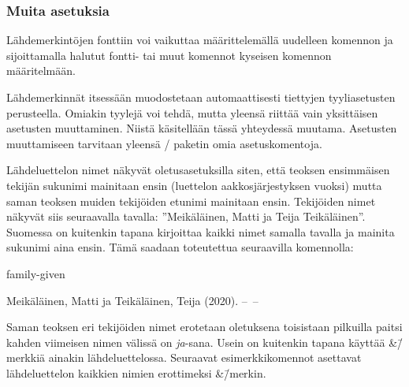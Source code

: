 \begin{koodilohkosis}
  \setlength{\bibitemsep}{.5ex plus .1ex minus .1ex}
  \setlength{\bibnamesep}{1em  plus .2ex minus .1ex}
  \setlength{\bibinitsep}{2em  plus .2ex minus .1ex}
\end{koodilohkosis}

\subsubsection{Muita asetuksia}

Lähdemerkintöjen fonttiin voi vaikuttaa määrittelemällä uudelleen
komennon  ja sijoittamalla halutut fontti- tai muut
komennot kyseisen komennon määritelmään.

\begin{koodilohkosis}
  \renewcommand{\bibfont}{\sffamily\small}
\end{koodilohkosis}

Lähdemerkinnät itsessään muodostetaan automaattisesti tiettyjen
tyyliasetusten perusteella. Omiakin tyylejä voi tehdä, mutta yleensä
riittää vain yksittäisen asetusten muuttaminen. Niistä käsitellään tässä
yhteydessä muutama. Asetusten muuttamiseen tarvitaan yleensä
\-/ paketin omia asetuskomentoja.

Lähdeluettelon nimet näkyvät oletusasetuksilla siten, että teoksen
ensimmäisen tekijän sukunimi mainitaan ensin (luettelon
aakkosjärjestyksen vuoksi) mutta saman teoksen muiden tekijöiden etunimi
mainitaan ensin. Tekijöiden nimet näkyvät siis seuraavalla tavalla:
''Meikäläinen, Matti ja Teija Teikäläinen''. Suomessa on kuitenkin
tapana kirjoittaa kaikki nimet samalla tavalla ja mainita sukunimi aina
ensin. Tämä saadaan toteutettua seuraavilla komennolla:

\begin{koodilohkosis}
   {family-given}
\end{koodilohkosis}

\begin{tulossis}
  Meikäläinen, Matti ja Teikäläinen, Teija (2020). --~--
\end{tulossis}

Saman teoksen eri tekijöiden nimet erotetaan oletuksena toisistaan
pilkuilla paitsi kahden viimeisen nimen välissä on \textit{ja}-sana.
Usein on kuitenkin tapana käyttää \&\=/merkkiä ainakin lähdeluettelossa.
Seuraavat esimerkkikomennot asettavat lähdeluettelon kaikkien nimien
erottimeksi \&\=/merkin.

